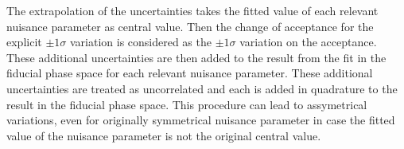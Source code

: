 The extrapolation of the uncertainties takes the fitted value of each relevant nuisance parameter as central value. Then the change of acceptance for the explicit $\pm 1 \sigma$ variation is considered as the $\pm 1 \sigma$ variation on the acceptance. These additional uncertainties are then added to the result from the fit in the fiducial phase space for each relevant nuisance parameter. These additional uncertainties are treated as uncorrelated and each is added in quadrature to the result in the fiducial phase space. This procedure can lead to assymetrical variations, even for originally symmetrical nuisance parameter in case the fitted value of the nuisance parameter is not the original central value.




